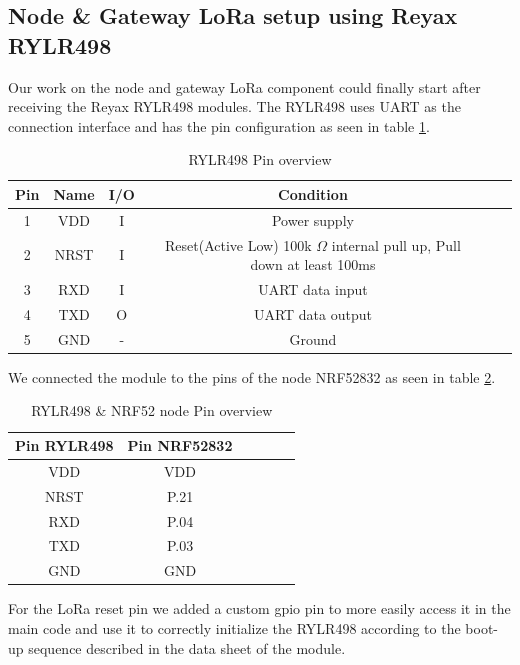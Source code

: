 \subsection{Node \& Gateway LoRa setup using Reyax RYLR498}
Our work on the node and gateway LoRa component could finally start after receiving the Reyax RYLR498 modules. The RYLR498 uses UART as the connection interface and has the pin configuration as seen in table \ref{tab:RYLR498_pin_overview}.

\begin{table}[h]
    \centering
    \begin{tabular}{|c|c|c|c|c|c|}
        \hline
        Pin & Name & I/O & Condition \\ \hline
        1   & VDD  & I & Power supply   \\ \hline
        2  & NRST  & I & Reset(Active Low) 100k $\Omega$ internal pull up, Pull down at least 100ms \\ \hline
        3  & RXD  & I  & UART data input  \\ \hline
        4  & TXD  & O  & UART data output    \\ \hline
        5  & GND & - & Ground \\ \hline
    \end{tabular}
    \caption{RYLR498 Pin overview}
    \label{tab:RYLR498_pin_overview}
\end{table}

\noindent{}We connected the module to the pins of the node NRF52832 as seen in table \ref{tab:RYLR498_pin_connections}.

\begin{table}[h!]
    \centering
    \begin{tabular}{|c|c|c|c|c|c|}
        \hline
        Pin RYLR498 & Pin NRF52832 \\ \hline
         VDD  & VDD   \\ \hline
         NRST & P.21 \\ \hline
         RXD  & P.04    \\ \hline
         TXD  & P.03  \\ \hline
         GND  & GND \\ \hline
    \end{tabular}
    \caption{RYLR498 \& NRF52 node Pin overview}
    \label{tab:RYLR498_pin_connections}
\end{table} 

\noindent{}For the LoRa reset pin we added a custom gpio pin to more easily access it in the main code and use it to correctly initialize the RYLR498 according to the boot-up sequence described in the data sheet of the module. 

